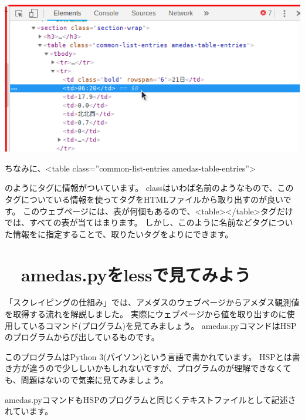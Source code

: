 \begin{center}
\includegraphics[width=\textwidth]{./text08-img/textbook-img035-3.png}

\end{center}
ちなみに、{\textless}table class=”common-list-entries amedas-table-entries”{\textgreater}

のようにタグに情報がついています。
classはいわば名前のようなもので、このタグについている情報を使ってタグをHTMLファイルから取り出すのが良いです。
このウェブページには、表が何個もあるので、{\textless}table{\textgreater}{\textless}/table{\textgreater}タグだけでは、すべての表が当てはまります。
しかし、このように名前などタグについた情報をに指定することで、取りたいタグをよりにできます。


\bigskip


\bigskip
{}
\clearpage\section{\theExercise　amedas.pyをlessで見てみよう}
\addtocounter{Exercise}{-1}\label{E:amedasLess}
「スクレイピングの仕組み」では、アメダスのウェブページからアメダス観測値を取得する流れを解説しました。
実際にウェブページから値を取り出すのに使用しているコマンド(プログラム)を見てみましょう。
amedas.pyコマンドはHSPのプログラムからび出しているものです。

このプログラムはPython
3(パイソン)という言語で書かれています。
HSPとは書き方が違うので少ししいかもしれないですが、プログラムのが理解できなくても、問題はないので気楽に見てみましょう。


\bigskip

amedas.pyコマンドもHSPのプログラムと同じくテキストファイルとして記述されています。

